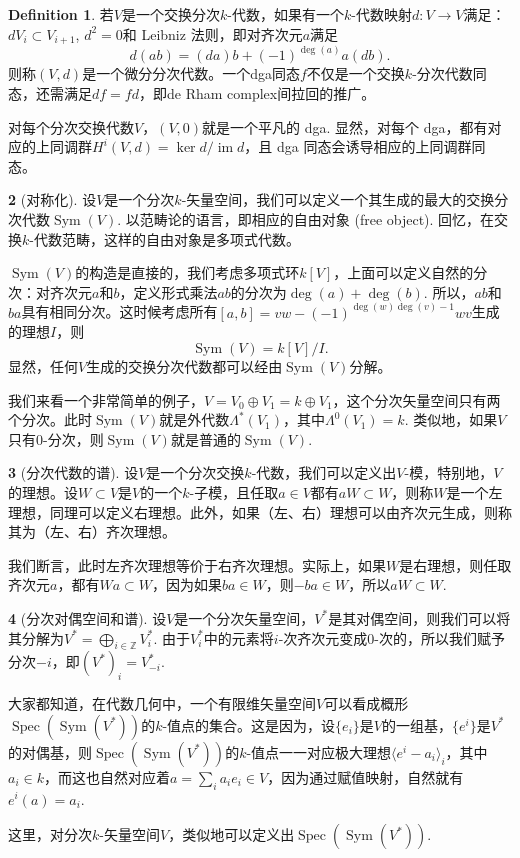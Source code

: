 \documentclass[10pt]{article}
\theoremstyle{definition}
\newtheorem{para}{}[section]
\newtheorem{defi}[para]{Definition}
\theoremstyle{plain}
\begin{document}
\begin{defi}
    若$V$是一个交换分次$k$-代数，如果有一个$k$-代数映射$d:V\to V$满足：$dV_i\subset V_{i+1}$, $d^2=0$和 Leibniz 法则，即对齐次元$a$满足
    \[
        d(ab)=(da)b+(-1)^{\deg(a)}a(db).
    \]
    则称$(V,d)$是一个微分分次代数。一个dga同态$f$不仅是一个交换$k$-分次代数同态，还需满足$df=fd$，即de Rham complex间拉回的推广。
\end{defi}

对每个分次交换代数$V$，$(V,0)$就是一个平凡的 dga. 
显然，对每个 dga，都有对应的上同调群$H^i(V,d)=\ker d/\operatorname{im} d$，且 dga 同态会诱导相应的上同调群同态。

\begin{para}[对称化]
    设$V$是一个分次$k$-矢量空间，我们可以定义一个其生成的最大的交换分次代数$\operatorname{Sym}(V)$. 以范畴论的语言，即相应的自由对象 (free object). 回忆，在交换$k$-代数范畴，这样的自由对象是多项式代数。

    $\operatorname{Sym}(V)$的构造是直接的，我们考虑多项式环$k[V]$，上面可以定义自然的分次：对齐次元$a$和$b$，定义形式乘法$ab$的分次为$\deg(a)+\deg(b)$. 所以，$ab$和$ba$具有相同分次。这时候考虑所有$[a,b]=vw-(-1)^{\deg(w)\deg(v)-1}wv$生成的理想$I$，则
    \[
        \operatorname{Sym}(V)=k[V]/I.
    \]
    显然，任何$V$生成的交换分次代数都可以经由$\operatorname{Sym}(V)$分解。

    我们来看一个非常简单的例子，$V=V_0\oplus V_1=k\oplus V_1$，这个分次矢量空间只有两个分次。此时$\operatorname{Sym}(V)$就是外代数$\Lambda^*(V_1)$，其中$\Lambda^0(V_1)=k$. 类似地，如果$V$只有$0$-分次，则$\operatorname{Sym}(V)$就是普通的$\operatorname{Sym}(V)$.
\end{para}

\begin{para}[分次代数的谱]
    设$V$是一个分次交换$k$-代数，我们可以定义出$V$-模，特别地，$V$的理想。设$W\subset V$是$V$的一个$k$-子模，且任取$a\in V$都有$aW\subset W$，则称$W$是一个左理想，同理可以定义右理想。此外，如果（左、右）理想可以由齐次元生成，则称其为（左、右）齐次理想。

    我们断言，此时左齐次理想等价于右齐次理想。实际上，如果$W$是右理想，则任取齐次元$a$，都有$Wa\subset W$，因为如果$ba\in W$，则$-ba\in W$，所以$aW\subset W$.
\end{para}

\begin{para}[分次对偶空间和谱]
    设$V$是一个分次矢量空间，$V^*$是其对偶空间，则我们可以将其分解为$V^*=\bigoplus_{i\in\mathbb Z}V_i^*$. 由于$V_i^*$中的元素将$i$-次齐次元变成$0$-次的，所以我们赋予分次$-i$，即$(V^*)_i=V_{-i}^*$.

    大家都知道，在代数几何中，一个有限维矢量空间$V$可以看成概形$\operatorname{Spec}(\operatorname{Sym}(V^*))$的$k$-值点的集合。这是因为，设$\{e_i\}$是$V$的一组基，$\{e^i\}$是$V^*$的对偶基，则$\operatorname{Spec}(\operatorname{Sym}(V^*))$的$k$-值点一一对应极大理想$\langle e^i-a_i\rangle_i$，其中$a_i\in k$，而这也自然对应着$a=\sum_i a_ie_i\in V$，因为通过赋值映射，自然就有$e^i(a)=a_i$.

    这里，对分次$k$-矢量空间$V$，类似地可以定义出$\operatorname{Spec}(\operatorname{Sym}(V^*))$.
\end{para}
\end{document}
